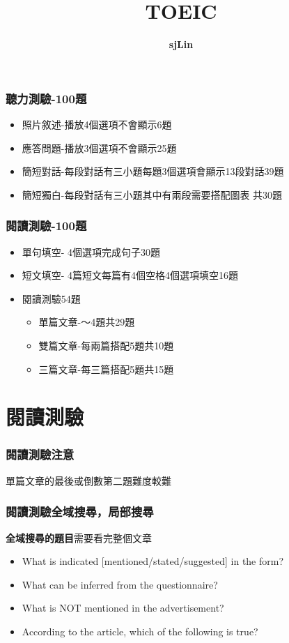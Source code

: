 \documentclass{beamer}
\title{\textbf{TOEIC}}
\author{\textbf{sjLin}}
\begin{document}
{\selectfont
\begin{CJK*}{UTF8}{bkai}

\maketitle





\begin{frame}
\frametitle{聽力測驗\;-\;100題}

\begin{itemize}
\item 照片敘述\;-\;播放4個選項\;不會顯示\;6題
\item 應答問題\;-\;播放3個選項\;不會顯示\;25題
\item 簡短對話\;-\;每段對話有三小題\;每題3個選項\;會顯示\;13段對話\;39題
\item 簡短獨白\;-\;每段對話有三小題\;其中有兩段需要搭配圖表  共30題
\end{itemize}

\end{frame}

\begin{frame}
\frametitle{閱讀測驗\;-\;100題}
\begin{itemize}
\item 單句填空\;-\; 4個選項完成句子\;30題
\item 短文填空\;-\; 4篇短文\;每篇有4個空格\;4個選項填空\;16題
\item 閱讀測驗\;54題
\begin{itemize}
\item 單篇文章\;-～4題\;共29題
\item 雙篇文章\;-\;每兩篇搭配5題\;共10題
\item 三篇文章\;-\;每三篇搭配5題\;共15題
\end{itemize}
\end{itemize}

\end{frame}

\section{閱讀測驗}
\begin{frame}
\frametitle{閱讀測驗\;注意}
單篇文章的最後或倒數第二題難度較難
\end{frame}
\begin{frame}
\frametitle{閱讀測驗\;全域搜尋，局部搜尋}
\textbf{全域搜尋的題目}\;需要看完整個文章
\begin{itemize}
\item What is indicated [mentioned/stated/suggested] in the form?
\item What can be inferred from the questionnaire?
\item What is NOT mentioned in the advertisement?
\item According to the article, which of the following is true?
\end{itemize}
\end{frame}


\end{CJK*}}
\end{document}
